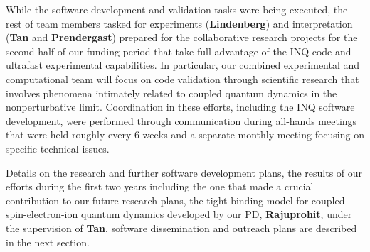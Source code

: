  While the software development and validation tasks were being executed, the rest of team members tasked for experiments ({\bf Lindenberg}) and interpretation ({\bf Tan} and {\bf Prendergast}) prepared for the collaborative research projects for the second half of our funding period that take full advantage of the INQ code and ultrafast experimental capabilities. In particular, our combined experimental and computational team will focus on code validation through scientific research that involves phenomena intimately related to coupled quantum dynamics in the nonperturbative limit. Coordination in these efforts, including the INQ software development, were performed through communication during all-hands meetings that were held roughly every 6 weeks and a separate monthly meeting focusing on specific technical issues.
 
 Details on the research and further software development plans, the results of our efforts during the first two years including the one that made a crucial contribution to our future research plans, the tight-binding model for coupled spin-electron-ion quantum dynamics developed by our PD, {\bf Rajuprohit}, under the supervision of {\bf Tan}, software dissemination and outreach plans are described in the next section.
 

\clearpage
